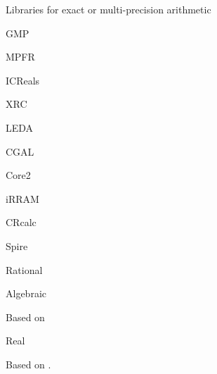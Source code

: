 \begin{plSection}{Libraries for exact or multi-precision arithmetic}

\begin{plSection}{GMP}

\end{plSection}
\begin{plSection}{MPFR}

\end{plSection}
\begin{plSection}{ICReals}

\cite{Briggs:2006:ImplementExactReals,Briggs:2013:XRC}

\end{plSection}
\begin{plSection}{XRC}

\cite{Briggs:2006:ImplementExactReals,Briggs:2013:XRC}

\end{plSection}
\begin{plSection}{LEDA}

\cite{Burnikel:1996,Burnikel:1999,MehlhornNaher:1995:LEDA,MelhornNaher:2005:LEDA}

\end{plSection}
\begin{plSection}{CGAL}

\end{plSection}
\begin{plSection}{Core2}

\cite{Karamcheti:1999}

\end{plSection}
\begin{plSection}{iRRAM}

\end{plSection}
\begin{plSection}{CRcalc}

\end{plSection}
\begin{plSection}{Spire}

\cite{OsheimEtal:2019:Spire}

\begin{plSection}{Rational}

\end{plSection}
\begin{plSection}{Algebraic}

Based on
\cite{Yap:2004:Guaranteed,LiPionYap:2004:ExactGeomComp,PionYap:2003:KaryRootBnd,PionYap:2006:KaryRootBnd,LiYap:2001:AlgebraicRootBound,Burnikel:2001}

\end{plSection}
\begin{plSection}{Real}

Based on \cite{Lester:2012:ShortestExactReal}.

\end{plSection}
 \end{plSection}
 \end{plSection}